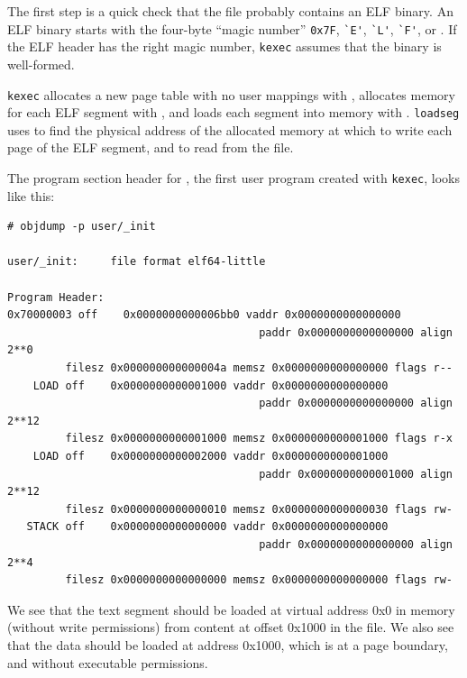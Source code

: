 The first step is a quick check that the file probably contains an
ELF binary.
An ELF binary starts with the four-byte ``magic number''
\lstinline{0x7F},
\lstinline{`E'},
\lstinline{`L'},
\lstinline{`F'},
or
.
If the ELF header has the right magic number,
\lstinline{kexec}
assumes that the binary is well-formed.

\lstinline{kexec}
allocates a new page table with no user mappings with
,
allocates memory for each ELF segment with
,
and loads each segment into memory with
.
\lstinline{loadseg}
uses
to find the physical address of the allocated memory at which to write
each page of the ELF segment, and
to read from the file.

The program section header for
,
the first user program created with
\lstinline{kexec},
looks like this:
\begin{footnotesize}
\begin{verbatim}
# objdump -p user/_init

user/_init:     file format elf64-little

Program Header:
0x70000003 off    0x0000000000006bb0 vaddr 0x0000000000000000
                                       paddr 0x0000000000000000 align 2**0
         filesz 0x000000000000004a memsz 0x0000000000000000 flags r--
    LOAD off    0x0000000000001000 vaddr 0x0000000000000000
                                       paddr 0x0000000000000000 align 2**12
         filesz 0x0000000000001000 memsz 0x0000000000001000 flags r-x
    LOAD off    0x0000000000002000 vaddr 0x0000000000001000
                                       paddr 0x0000000000001000 align 2**12
         filesz 0x0000000000000010 memsz 0x0000000000000030 flags rw-
   STACK off    0x0000000000000000 vaddr 0x0000000000000000
                                       paddr 0x0000000000000000 align 2**4
         filesz 0x0000000000000000 memsz 0x0000000000000000 flags rw-
\end{verbatim}
\end{footnotesize}

We see that the text segment should be loaded at virtual address 0x0
in memory (without write permissions) from content at offset
0x1000 in the file. We also see that the data should be loaded at
address 0x1000, which is at a page boundary, and without executable
permissions.

